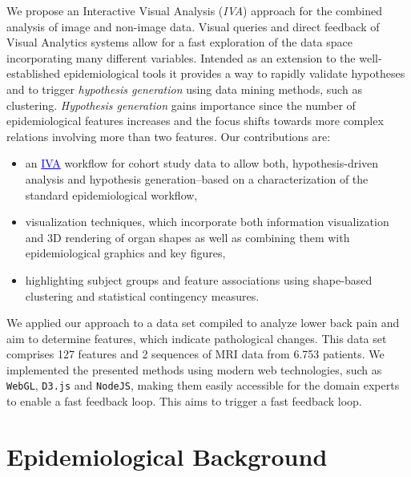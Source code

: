 \documentclass[journal]{style/vgtc} 			          %
\newcommand{\add}[1]{\textcolor{blue}{\uline{#1}}}
\begin{document}
We propose an Interactive Visual Analysis (\emph{IVA}) approach \cite{Thomas2005} for the combined analysis of image and non-image data.
%
Visual queries and direct feedback of Visual Analytics systems allow for a fast exploration of the data space incorporating many different variables.
%
Intended as an extension to the well-established epidemiological tools it provides a way to rapidly validate hypotheses and to trigger \emph{hypothesis generation} using data mining methods, such as clustering.
%
\emph{Hypothesis generation} gains importance since the number of epidemiological features increases and the focus shifts towards more complex relations involving more than two features. Our contributions are:
\begin{itemize}
	\item an \add{IVA} workflow for cohort study data to allow both, hypothesis-driven analysis and hypothesis generation--based on a characterization of the standard epidemiological workflow,
	\item visualization techniques, which incorporate both information visualization and 3D rendering of organ shapes as well as combining them with epidemiological graphics and key figures,
	\item highlighting subject groups and feature associations using shape-based clustering and statistical contingency measures.
\end{itemize}
We applied our approach to a data set compiled to analyze lower back pain and aim to determine features, which indicate pathological changes.
%
This data set comprises 127 features and 2 sequences of MRI data from 6.753 patients.
%
We implemented the presented methods using modern web technologies, such as \texttt{WebGL}, \texttt{D3.js} and \texttt{NodeJS}, making them easily accessible for the domain experts to enable a fast feedback loop.
%
This aims to trigger a fast feedback loop. %

\section{Epidemiological Background} \label{MedicalAndTechnicalBackground}
\end{document}
